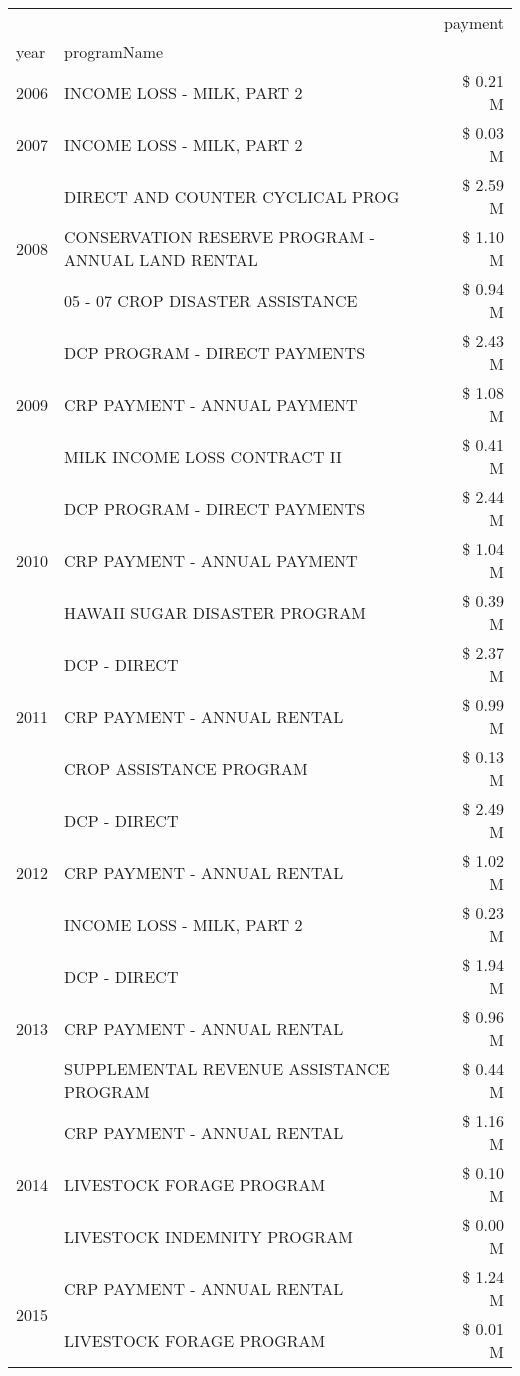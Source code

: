 \begin{tabular}{llr}
\toprule
 &  & payment \\
year & programName &  \\
\midrule
2006 & INCOME LOSS - MILK, PART 2 & \$ 0.21 M \\
\cline{1-3}
2007 & INCOME LOSS - MILK, PART 2 & \$ 0.03 M \\
\cline{1-3}
\multirow[t]{3}{*}{2008} & DIRECT AND COUNTER CYCLICAL PROG & \$ 2.59 M \\
 & CONSERVATION RESERVE PROGRAM - ANNUAL LAND RENTAL & \$ 1.10 M \\
 & 05 - 07 CROP DISASTER ASSISTANCE & \$ 0.94 M \\
\cline{1-3}
\multirow[t]{3}{*}{2009} & DCP PROGRAM - DIRECT PAYMENTS & \$ 2.43 M \\
 & CRP PAYMENT - ANNUAL PAYMENT & \$ 1.08 M \\
 & MILK INCOME LOSS CONTRACT II & \$ 0.41 M \\
\cline{1-3}
\multirow[t]{3}{*}{2010} & DCP PROGRAM - DIRECT PAYMENTS & \$ 2.44 M \\
 & CRP PAYMENT - ANNUAL PAYMENT & \$ 1.04 M \\
 & HAWAII SUGAR DISASTER PROGRAM & \$ 0.39 M \\
\cline{1-3}
\multirow[t]{3}{*}{2011} & DCP - DIRECT & \$ 2.37 M \\
 & CRP PAYMENT - ANNUAL RENTAL & \$ 0.99 M \\
 & CROP ASSISTANCE PROGRAM & \$ 0.13 M \\
\cline{1-3}
\multirow[t]{3}{*}{2012} & DCP - DIRECT & \$ 2.49 M \\
 & CRP PAYMENT - ANNUAL RENTAL & \$ 1.02 M \\
 & INCOME LOSS - MILK, PART 2 & \$ 0.23 M \\
\cline{1-3}
\multirow[t]{3}{*}{2013} & DCP - DIRECT & \$ 1.94 M \\
 & CRP PAYMENT - ANNUAL RENTAL & \$ 0.96 M \\
 & SUPPLEMENTAL REVENUE ASSISTANCE PROGRAM & \$ 0.44 M \\
\cline{1-3}
\multirow[t]{3}{*}{2014} & CRP PAYMENT - ANNUAL RENTAL & \$ 1.16 M \\
 & LIVESTOCK FORAGE PROGRAM & \$ 0.10 M \\
 & LIVESTOCK INDEMNITY PROGRAM & \$ 0.00 M \\
\cline{1-3}
\multirow[t]{3}{*}{2015} & CRP PAYMENT - ANNUAL RENTAL & \$ 1.24 M \\
 & LIVESTOCK FORAGE PROGRAM & \$ 0.01 M \\

\end{tabular}
